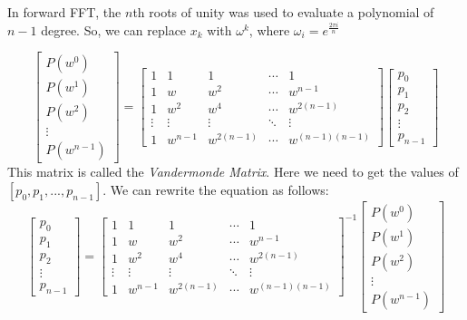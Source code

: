 \documentclass[28]{report}
\begin{document}
In forward FFT, the $n$th roots of unity was used to evaluate a polynomial of $n-1$ degree. So, we can replace $x_k$ with $\omega^k$, where $\omega_i = e^{\frac{2\pi i}{n}}$

\begin{equation*}
  \begin{bmatrix}
    P(w^0) \\
    P(w^1) \\
    P(w^2) \\
    \vdots \\
    P(w^{n-1})
  \end{bmatrix} 
    = 
    \begin{bmatrix} 
      1     & 1     & 1     & \cdots & 1    \\ 
      1     & w     & w^2   & \cdots & w^{n-1} \\ 
      1     & w^2   & w^4   & \cdots & w^{2(n-1)} \\
      \vdots & \vdots & \vdots  & \ddots & \vdots \\
      1 & w^{n-1} & w^{2(n-1)}  & \cdots & w^{(n-1)(n-1)} 
    \end{bmatrix} 
    \begin{bmatrix}
        p_0 \\
        p_1 \\
        p_2 \\
        \vdots \\
        p_{n-1}
    \end{bmatrix}
\end{equation*}
This matrix is called the \textit{Vandermonde Matrix}.
Here we need to get the values of $[p_0, p_1, ... , p_{n-1}]$. We can rewrite the equation as follows:
\begin{equation*}
    \begin{bmatrix}
        p_0 \\
        p_1 \\
        p_2 \\
        \vdots \\
        p_{n-1}
    \end{bmatrix}
    = 
    {\begin{bmatrix} 
      1     & 1     & 1     & \cdots & 1    \\ 
      1     & w     & w^2   & \cdots & w^{n-1} \\ 
      1     & w^2   & w^4   & \cdots & w^{2(n-1)} \\
      \vdots & \vdots & \vdots  & \ddots & \vdots \\
      1 & w^{n-1} & w^{2(n-1)}  & \cdots & w^{(n-1)(n-1)} 
    \end{bmatrix} }^{-1}
    \begin{bmatrix}
    P(w^0) \\
    P(w^1) \\
    P(w^2) \\
    \vdots \\
    P(w^{n-1})
  \end{bmatrix}     
\end{equation*}
\end{document}
